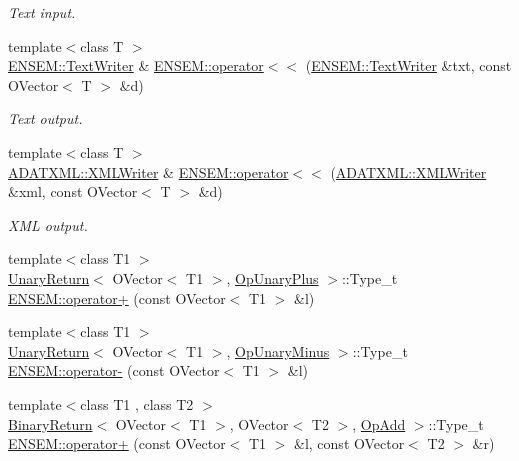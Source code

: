 \begin{DoxyCompactItemize}
\begin{DoxyCompactList}\small\item\em Text input. \end{DoxyCompactList}\item 
{\footnotesize template$<$class T $>$ }\\\mbox{\hyperlink{classENSEM_1_1TextWriter}{E\+N\+S\+E\+M\+::\+Text\+Writer}} \& \mbox{\hyperlink{group__obsvector_gab5665d6ff814904bdb812d03f102731a}{E\+N\+S\+E\+M\+::operator$<$$<$}} (\mbox{\hyperlink{classENSEM_1_1TextWriter}{E\+N\+S\+E\+M\+::\+Text\+Writer}} \&txt, const O\+Vector$<$ T $>$ \&d)
\begin{DoxyCompactList}\small\item\em Text output. \end{DoxyCompactList}\item 
{\footnotesize template$<$class T $>$ }\\\mbox{\hyperlink{classADATXML_1_1XMLWriter}{A\+D\+A\+T\+X\+M\+L\+::\+X\+M\+L\+Writer}} \& \mbox{\hyperlink{group__obsvector_ga21a786931a7efb82964106799b422557}{E\+N\+S\+E\+M\+::operator$<$$<$}} (\mbox{\hyperlink{classADATXML_1_1XMLWriter}{A\+D\+A\+T\+X\+M\+L\+::\+X\+M\+L\+Writer}} \&xml, const O\+Vector$<$ T $>$ \&d)
\begin{DoxyCompactList}\small\item\em X\+ML output. \end{DoxyCompactList}\item 
{\footnotesize template$<$class T1 $>$ }\\\mbox{\hyperlink{structUnaryReturn}{Unary\+Return}}$<$ O\+Vector$<$ T1 $>$, \mbox{\hyperlink{structOpUnaryPlus}{Op\+Unary\+Plus}} $>$\+::Type\+\_\+t \mbox{\hyperlink{group__obsvector_gac2f83a4dfd7def38a8b25cf6a1e32c7c}{E\+N\+S\+E\+M\+::operator+}} (const O\+Vector$<$ T1 $>$ \&l)
\item 
{\footnotesize template$<$class T1 $>$ }\\\mbox{\hyperlink{structUnaryReturn}{Unary\+Return}}$<$ O\+Vector$<$ T1 $>$, \mbox{\hyperlink{structOpUnaryMinus}{Op\+Unary\+Minus}} $>$\+::Type\+\_\+t \mbox{\hyperlink{group__obsvector_ga914cf43b5cebf3dc6244c6f4f82435be}{E\+N\+S\+E\+M\+::operator-\/}} (const O\+Vector$<$ T1 $>$ \&l)
\item 
{\footnotesize template$<$class T1 , class T2 $>$ }\\\mbox{\hyperlink{structBinaryReturn}{Binary\+Return}}$<$ O\+Vector$<$ T1 $>$, O\+Vector$<$ T2 $>$, \mbox{\hyperlink{structOpAdd}{Op\+Add}} $>$\+::Type\+\_\+t \mbox{\hyperlink{group__obsvector_gab0356c94496b2d6ffd11e6e595df0ea8}{E\+N\+S\+E\+M\+::operator+}} (const O\+Vector$<$ T1 $>$ \&l, const O\+Vector$<$ T2 $>$ \&r)

\end{DoxyCompactItemize}
